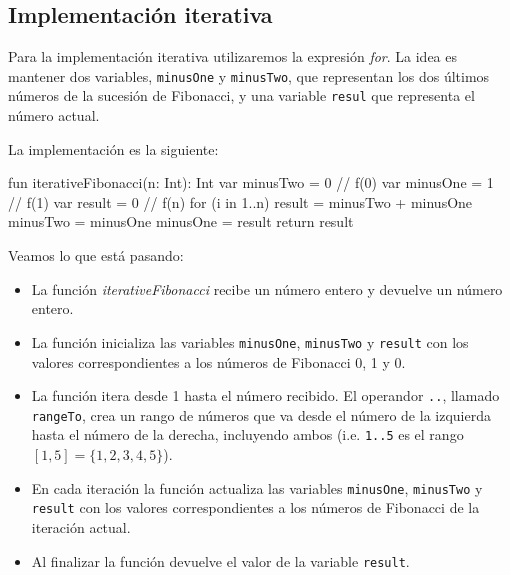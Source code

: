 \subsection{Implementación iterativa}
  \label{subsec:Implementacion_iterativa}

  Para la implementación iterativa utilizaremos la expresión \textit{for}.
  La idea es mantener dos variables, \texttt{minusOne} y \texttt{minusTwo}, que representan los dos 
  últimos números de la sucesión de Fibonacci, y una variable \texttt{resul} que representa el 
  número actual.

  La implementación es la siguiente:
  \begin{kotlin}
    fun iterativeFibonacci(n: Int): Int {
      var minusTwo = 0  // f(0)
      var minusOne = 1  // f(1)
      var result = 0    // f(n)
      for (i in 1..n) {
        result = minusTwo + minusOne
        minusTwo = minusOne
        minusOne = result
      }
      return result
    }
  \end{kotlin}

  Veamos lo que está pasando:

  \begin{itemize}
    \item La función \textit{iterativeFibonacci} recibe un número entero y devuelve un número 
      entero.
    \item La función inicializa las variables \texttt{minusOne}, \texttt{minusTwo} y \texttt{result} 
      con los valores correspondientes a los números de Fibonacci 0, 1 y 0.
    \item La función itera desde 1 hasta el número recibido. 
      El operandor \texttt{..}, llamado \texttt{rangeTo}, crea un rango de números que va desde el 
      número de la izquierda hasta el número de la derecha, incluyendo ambos (i.e. \texttt{1..5} es 
      el rango \([1, 5] = \{1, 2, 3, 4, 5\}\)).
    \item En cada iteración la función actualiza las variables \texttt{minusOne}, \texttt{minusTwo} y 
      \texttt{result} con los valores correspondientes a los números de Fibonacci de la iteración 
      actual.
    \item Al finalizar la función devuelve el valor de la variable \texttt{result}.
  \end{itemize}